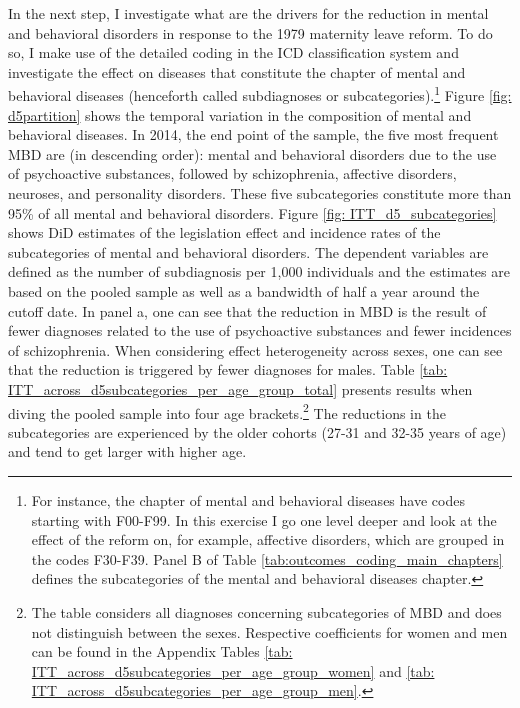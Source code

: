 \documentclass[11pt, a4paper]{article} %
\begin{document}
In the next step, I investigate what are the drivers for the reduction in mental and behavioral disorders in response to the 1979 maternity leave reform. To do so, I make use of the detailed coding in the ICD classification system and investigate the effect on diseases that constitute the chapter of mental and behavioral diseases (henceforth called subdiagnoses or subcategories).\footnote{For instance, the chapter of mental and behavioral diseases have codes starting with F00-F99. In this exercise I go one level deeper and look at the effect of the reform on, for example, affective disorders, which are grouped in the codes F30-F39. Panel B of Table \ref{tab:outcomes_coding_main_chapters} defines the subcategories of the mental and behavioral diseases chapter.} Figure \ref{fig: d5partition} shows the temporal variation in the composition of mental and behavioral diseases. In 2014, the end point of the sample, the five most frequent MBD are (in descending order): mental and behavioral disorders due to the use of psychoactive substances, followed by schizophrenia, affective disorders, neuroses, and personality disorders. These five subcategories constitute more than 95\% of all mental and behavioral disorders. Figure \ref{fig: ITT_d5_subcategories} shows DiD estimates of the legislation effect and incidence rates of the subcategories of mental and behavioral disorders. The dependent variables are defined as the number of subdiagnosis per 1,000 individuals and the estimates are based on the pooled sample as well as a bandwidth of half a year around the cutoff date. In panel a, one can see that the reduction in MBD is the result of fewer diagnoses related to the use of psychoactive substances and fewer incidences of schizophrenia. When considering effect heterogeneity across sexes, one can see that the reduction is triggered by fewer diagnoses for males. Table \ref{tab: ITT_across_d5subcategories_per_age_group_total} presents results when diving the pooled sample into four age brackets.\footnote{The table considers all diagnoses concerning subcategories of MBD and does not distinguish between the sexes. Respective coefficients for women and men can be found in the Appendix Tables \ref{tab: ITT_across_d5subcategories_per_age_group_women} and \ref{tab: ITT_across_d5subcategories_per_age_group_men}.} The reductions in the subcategories are experienced by the older cohorts (27-31 and 32-35 years of age) and tend to get larger with higher age.\newline
\end{document}
